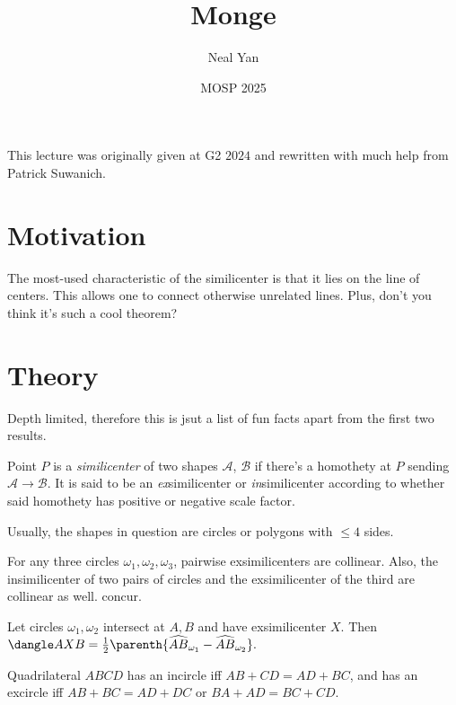 \documentclass{seto}
\title{Monge}
\author{Neal Yan}
\date{MOSP 2025}
\begin{document}
\maketitle
{}
\begin{remark}[Credits] This lecture was originally given at 
G2 $2024$ and rewritten with much help from Patrick Suwanich. 
\end{remark}
\section{Motivation}
The most-used characteristic of the similicenter is that it lies on the line of centers. This allows 
one to connect otherwise unrelated lines. Plus, don't you think it's such a cool theorem? 
\section{Theory}
Depth limited, therefore this is jsut a list of fun facts apart from the first two results.
\begin{thm}
    Point $P$ is a \emph{similicenter} of two shapes $\mathcal A$, $\mathcal B$ if there's a homothety at 
    $P$ sending $\mathcal A\to\mathcal B$. 
    It is said to be an \emph{ex}similicenter or \emph{in}similicenter according to whether said homothety
    has positive or negative scale factor.
\end{thm}
Usually, the shapes in question are circles or polygons with $\le4$ sides.
\begin{thm}
For any three circles $\omega_1,\omega_2,\omega_3$, pairwise exsimilicenters are collinear.
Also, the insimilicenter of two pairs of circles and 
the exsimilicenter of the third are collinear as well.
concur.
\end{thm}
\begin{thm}
Let circles $\omega_1,\omega_2$ intersect at $A,B$ and have exsimilicenter $X$. 
Then \(\dangle AXB=\frac12\parenth{\widehat{AB}_{\omega_1}-\widehat{AB}_{\omega_2} }.\)
\end{thm}
\begin{thm}[Pitot]
Quadrilateral $ABCD$ has an incircle iff $AB+CD=AD+BC$, and has an excircle iff 
$AB+BC=AD+DC$ or $BA+AD=BC+CD$.
\end{thm}
\end{document}
